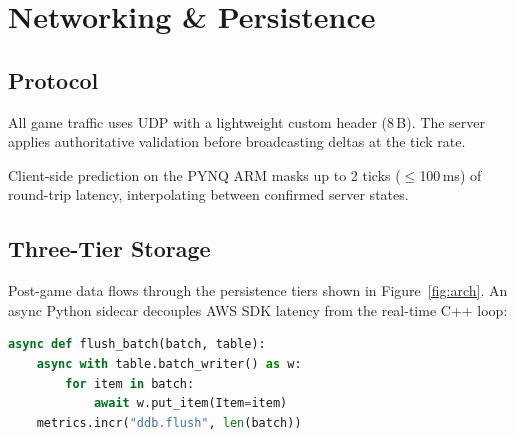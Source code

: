 \section{Networking \& Persistence}

\subsection{Protocol}

All game traffic uses UDP with a lightweight custom header (8\,B).  The server applies authoritative validation before broadcasting deltas at the tick rate.

\begin{designnote}
Client-side prediction on the PYNQ ARM masks up to 2 ticks ($\leq$100\,ms) of round-trip latency, interpolating between confirmed server states.
\end{designnote}

\subsection{Three-Tier Storage}

Post-game data flows through the persistence tiers shown in Figure~\ref{fig:arch}.  An async Python sidecar decouples AWS SDK latency from the real-time C++ loop:

\begin{lstlisting}[language=Python, caption={Sidecar write-behind batch flush.}]
async def flush_batch(batch, table):
    async with table.batch_writer() as w:
        for item in batch:
            await w.put_item(Item=item)
    metrics.incr("ddb.flush", len(batch))
\end{lstlisting}

